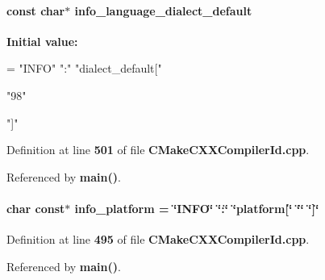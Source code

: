 \paragraph[{info\+\_\+language\+\_\+dialect\+\_\+default}]{\setlength{\rightskip}{0pt plus 5cm}const char$\ast$ info\+\_\+language\+\_\+dialect\+\_\+default}\label{soapysdr_2build_2CMakeFiles_23_85_81_2CompilerIdCXX_2CMakeCXXCompilerId_8cpp_a1ce162bad2fe6966ac8b33cc19e120b8}
{\bfseries Initial value\+:}
\begin{DoxyCode}
= \textcolor{stringliteral}{"INFO"} \textcolor{stringliteral}{":"} \textcolor{stringliteral}{"dialect\_default["}





  \textcolor{stringliteral}{"98"}

\textcolor{stringliteral}{"]"}
\end{DoxyCode}


Definition at line {\bf 501} of file {\bf C\+Make\+C\+X\+X\+Compiler\+Id.\+cpp}.



Referenced by {\bf main()}.

\paragraph[{info\+\_\+platform}]{\setlength{\rightskip}{0pt plus 5cm}char const$\ast$ info\+\_\+platform = \char`\"{}I\+N\+FO\char`\"{} \char`\"{}\+:\char`\"{} \char`\"{}platform[\char`\"{} \char`\"{}\char`\"{} \char`\"{}]\char`\"{}}\label{soapysdr_2build_2CMakeFiles_23_85_81_2CompilerIdCXX_2CMakeCXXCompilerId_8cpp_a2321403dee54ee23f0c2fa849c60f7d4}


Definition at line {\bf 495} of file {\bf C\+Make\+C\+X\+X\+Compiler\+Id.\+cpp}.



Referenced by {\bf main()}.

